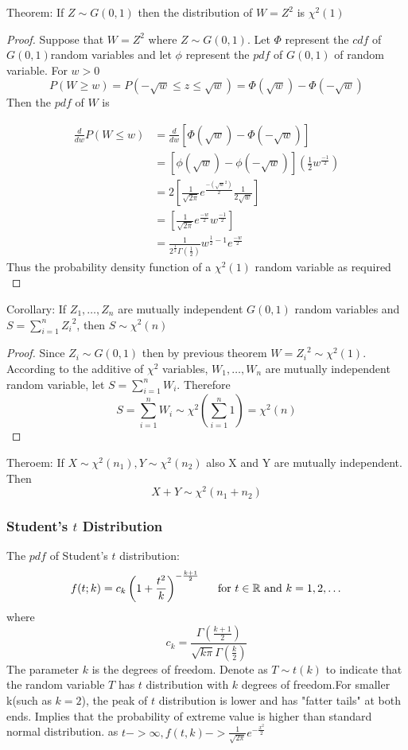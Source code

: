 \documentclass{article}
\newcommand{\R}{\mathbb{R}}
\newcommand{\sqr}[1]{{#1}^2}
\begin{document}
\noindent Theorem: If $Z \sim G(0,1)$ then the distribution of $W=\sqr{Z}$ is $\sqr{\chi}(1)$
\begin{proof}
    Suppose that $W = \sqr{Z}$ where $Z\sim G(0,1)$. Let $\Phi$ represent the $cdf$ of $G(0,1)$random variables and let $\phi$ represent the $pdf$ of $G(0,1)$ of random variable.
    For $w>0$
\[
P(W\ge w) = P(-\sqrt{w}\le z \le \sqrt{w}) = \Phi(\sqrt{w}) - \Phi(-\sqrt{w})
\]
Then the $pdf$ of $W$ is

\begin{align*}
    \frac{d}{dw}P(W\le w) &= \frac{d}{dw}\left[\Phi(\sqrt{w}) - \Phi(-\sqrt{w})\right] \\
&= \left[\phi(\sqrt{w}) - \phi(-\sqrt{w})\right]\left(\frac{1}{2}w^{\frac{-1}{2}}\right)\\
&= 2\left[\frac{1}{\sqrt{2\pi}}e^{\frac{-(\sqr{\sqrt{w}})}{2}}\frac{1}{2\sqrt{w}}\right]\\
&= \left[\frac{1}{\sqrt{2\pi}}e^{\frac{-w}{2}}w^{\frac{-1}{2}}\right]\\
&= \frac{1}{2^{\frac{1}{2}}\Gamma(\frac{1}{2})}w^{\frac{1}{2} - 1}e^{\frac{-w}{2}}
\end{align*}
Thus the probability density function of a $\sqr{\chi}(1)$ random variable as required\\
\end{proof}
\noindent Corollary: If $Z_1, \dotsc, Z_n$ are mutually independent $G(0,1)$ random variables and $S = \sum_{i=1}^{n}\sqr{Z_i}$, then $S\sim \sqr{\chi}(n)$
\begin{proof}
    Since $Z_i \sim G(0,1)$ then by previous theorem $W = \sqr{Z_i} \sim \sqr{\chi}(1)$. According to the additive of $\sqr{\chi}$ variables, $W_1, \dotsc, W_n$ are mutually independent random variable, let $S = \sum_{i=1}^{n}W_i$. Therefore
    $$S = \sum_{i=1}^{n}W_i \sim \sqr{\chi}\left(\sum_{i=1}^{n}1\right) = \sqr{\chi}(n)$$ 
\end{proof}

\noindent Theroem: If $X \sim \sqr{\chi}(n_1), Y\sim \sqr{\chi}(n_2)$ also X and Y are mutually independent. Then
\[
X + Y \sim \sqr{\chi}(n_1 + n_2)
\]
\subsubsection{Student's $t$ Distribution}
The $pdf$ of Student's $t$ distribution:
\[
f(t;k) = c_k\left(1+\frac{\sqr{t}}{k}\right)^{-\frac{k+1}{2}} \indent \text{for } t\in \R \text{ and } k = 1, 2,\dotsc
\]
where
\[
c_k= \frac{\Gamma(\frac{k+1}{2})}{\sqrt{k\pi}\Gamma(\frac{k}{2})}
\]
The parameter $k$ is the degrees of freedom. Denote as $T\sim t(k)$ to indicate that the random variable $T$ has $t$ distribution with $k$ degrees of freedom.For smaller k(such as $k=2$), 
the peak of $t$ distribution is lower and has "fatter tails" at both ends.
Implies that the probability of extreme value is higher than standard normal distribution.
as $t -> \infty, f(t, k) -> \frac{1}{\sqrt{2\pi}}e^{-\frac{\sqr{x}}{2}}$
\end{document}
